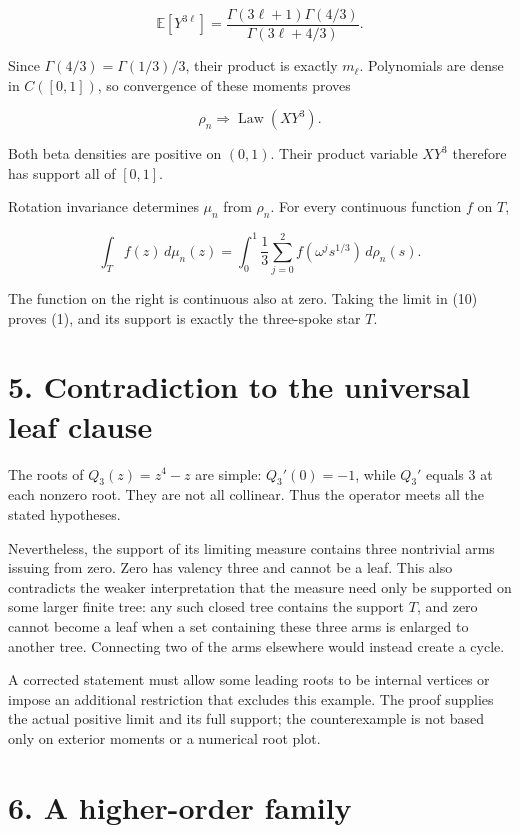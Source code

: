 \documentclass[11pt,a4paper]{article}
\begin{document}
\[
\mathbb E[Y^{3\ell}]
=\frac{\Gamma(3\ell+1)\Gamma(4/3)}
 {\Gamma(3\ell+4/3)}.
\]

Since \(\Gamma(4/3)=\Gamma(1/3)/3\), their product is exactly
\(m_\ell\). Polynomials are dense in \(C([0,1])\), so convergence of
these moments proves

\[
\rho_n\Longrightarrow\operatorname{Law}(XY^3).
\tag{10}
\]

Both beta densities are positive on \((0,1)\). Their product variable
\(XY^3\) therefore has support all of \([0,1]\).

Rotation invariance determines \(\mu_n\) from \(\rho_n\). For every
continuous function \(f\) on \(T\),

\[
\int_T f(z)\,d\mu_n(z)
=\int_0^1\frac13\sum_{j=0}^2
 f(\omega^j s^{1/3})\,d\rho_n(s).
\]

The function on the right is continuous also at zero. Taking the limit
in (10) proves (1), and its support is exactly the three-spoke star
\(T\).

\hypertarget{1032-contradiction-to-the-universal-leaf-clause}{%
\section{5. Contradiction to the universal leaf
clause}\label{1032-contradiction-to-the-universal-leaf-clause}}

The roots of \(Q_3(z)=z^4-z\) are simple: \(Q_3'(0)=-1\), while \(Q_3'\)
equals \(3\) at each nonzero root. They are not all collinear. Thus the
operator meets all the stated hypotheses.

Nevertheless, the support of its limiting measure contains three
nontrivial arms issuing from zero. Zero has valency three and cannot be
a leaf. This also contradicts the weaker interpretation that the measure
need only be supported on some larger finite tree: any such closed tree
contains the support \(T\), and zero cannot become a leaf when a set
containing these three arms is enlarged to another tree. Connecting two
of the arms elsewhere would instead create a cycle.

A corrected statement must allow some leading roots to be internal
vertices or impose an additional restriction that excludes this example.
The proof supplies the actual positive limit and its full support; the
counterexample is not based only on exterior moments or a numerical root
plot.

\hypertarget{1032-a-higher-order-family}{%
\section{6. A higher-order family}\label{1032-a-higher-order-family}}
\end{document}
